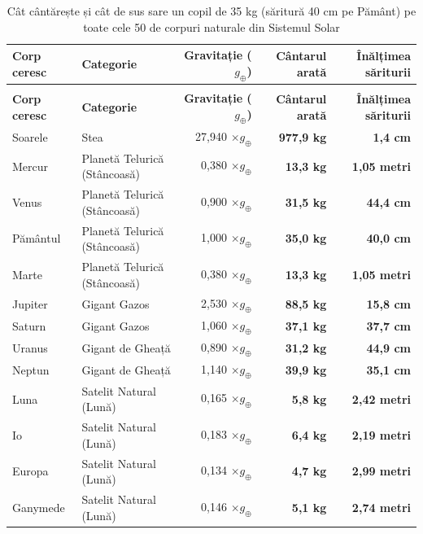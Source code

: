 \begingroup
\small
\begin{longtable}{@{} >{\raggedright\arraybackslash}p{2.5cm} >{\raggedright\arraybackslash}p{3.1cm} r r r @{}}
\caption{Cât cântărește și cât de sus sare un copil de 35 kg (săritură 40 cm pe Pământ) pe toate cele 50 de corpuri naturale din Sistemul Solar} \\
\toprule
\textbf{Corp ceresc} & \textbf{Categorie} & \textbf{Gravitație ($g_\oplus$)} & \textbf{Cântarul arată} & \textbf{Înălțimea săriturii} \\
\midrule
\endfirsthead
\multicolumn{5}{c}{{\footnotesize\itshape (continuare de pe pagina anterioară)}} \\
\toprule
\textbf{Corp ceresc} & \textbf{Categorie} & \textbf{Gravitație ($g_\oplus$)} & \textbf{Cântarul arată} & \textbf{Înălțimea săriturii} \\
\midrule
\endhead
\bottomrule
\endfoot
Soarele & Stea & 27,940 $\times g_\oplus$ & \textbf{977,9 kg} & \textbf{1,4 cm} \\
Mercur & Planetă Telurică (Stâncoasă) & 0,380 $\times g_\oplus$ & \textbf{13,3 kg} & \textbf{1,05 metri} \\
Venus & Planetă Telurică (Stâncoasă) & 0,900 $\times g_\oplus$ & \textbf{31,5 kg} & \textbf{44,4 cm} \\
Pământul & Planetă Telurică (Stâncoasă) & 1,000 $\times g_\oplus$ & \textbf{35,0 kg} & \textbf{40,0 cm} \\
Marte & Planetă Telurică (Stâncoasă) & 0,380 $\times g_\oplus$ & \textbf{13,3 kg} & \textbf{1,05 metri} \\
Jupiter & Gigant Gazos & 2,530 $\times g_\oplus$ & \textbf{88,5 kg} & \textbf{15,8 cm} \\
Saturn & Gigant Gazos & 1,060 $\times g_\oplus$ & \textbf{37,1 kg} & \textbf{37,7 cm} \\
Uranus & Gigant de Gheață & 0,890 $\times g_\oplus$ & \textbf{31,2 kg} & \textbf{44,9 cm} \\
Neptun & Gigant de Gheață & 1,140 $\times g_\oplus$ & \textbf{39,9 kg} & \textbf{35,1 cm} \\
Luna & Satelit Natural (Lună) & 0,165 $\times g_\oplus$ & \textbf{5,8 kg} & \textbf{2,42 metri} \\
Io & Satelit Natural (Lună) & 0,183 $\times g_\oplus$ & \textbf{6,4 kg} & \textbf{2,19 metri} \\
Europa & Satelit Natural (Lună) & 0,134 $\times g_\oplus$ & \textbf{4,7 kg} & \textbf{2,99 metri} \\
Ganymede & Satelit Natural (Lună) & 0,146 $\times g_\oplus$ & \textbf{5,1 kg} & \textbf{2,74 metri} \\

\end{longtable}
